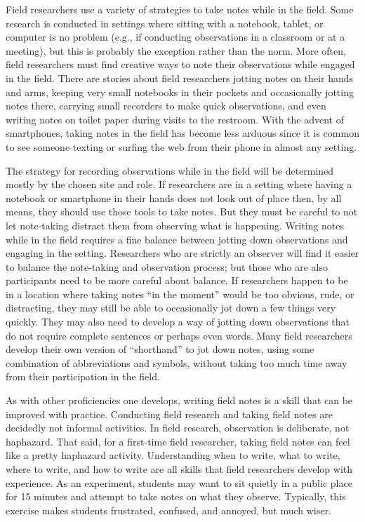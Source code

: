Field researchers use a variety of strategies to take notes while in the field. Some research is conducted in settings where sitting with a notebook, tablet, or computer is no problem (e.g., if conducting observations in a classroom or at a meeting), but this is probably the exception rather than the norm. More often, field researchers must find creative ways to note their observations while engaged in the field. There are stories about field researchers jotting notes on their hands and arms, keeping very small notebooks in their pockets and occasionally jotting notes there, carrying small recorders to make quick observations, and even writing notes on toilet paper during visits to the restroom. With the advent of smartphones, taking notes in the field has become less arduous since it is common to see someone texting or surfing the web from their phone in almost any setting.

The strategy for recording observations while in the field will be determined mostly by the chosen site and role. If researchers are in a setting where having a notebook or smartphone in their hands does not look out of place then, by all means, they should use those tools to take notes. But they must be careful to not let note-taking distract them from observing what is happening. Writing notes while in the field requires a fine balance between jotting down observations and engaging in the setting. Researchers who are strictly an observer will find it easier to balance the note-taking and observation process; but those who are also participants need to be more careful about balance. If researchers happen to be in a location where taking notes ``in the moment'' would be too obvious, rude, or distracting, they may still be able to occasionally jot down a few things very quickly. They may also need to develop a way of jotting down observations that do not require complete sentences or perhaps even words. Many field researchers develop their own version of ``shorthand'' to jot down notes, using some combination of abbreviations and symbols, without taking too much time away from their participation in the field.

As with other proficiencies one develops, writing field notes is a skill that can be improved with practice. Conducting field research and taking field notes are decidedly not informal activities. In field research, observation is deliberate, not haphazard. That said, for a first-time field researcher, taking field notes can feel like a pretty haphazard activity. Understanding when to write, what to write, where to write, and how to write are all skills that field researchers develop with experience. As an experiment, students may want to sit quietly in a public place for 15 minutes and attempt to take notes on what they observe. Typically, this exercise makes students frustrated, confused, and annoyed, but much wiser.


